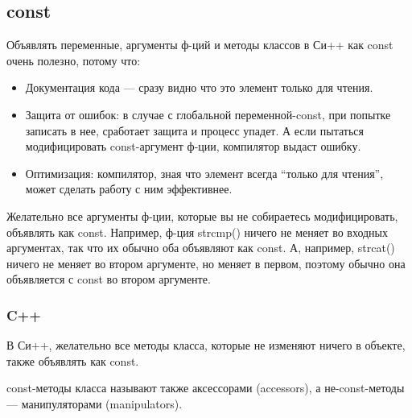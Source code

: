 ﻿\subsection{const}

Объявлять переменные, аргументы ф-ций и методы классов в Си++ как const очень полезно, потому что:

\begin{itemize}
\item
Документация кода --- сразу видно что это элемент только для чтения.

\item
Защита от ошибок: в случае с глобальной переменной-const, при попытке записать в нее, 
сработает защита и процесс упадет.
А если пытаться модифицировать const-аргумент ф-ции, компилятор выдаст ошибку.

\item
Оптимизация: компилятор, зная что элемент всегда ``только для чтения'', может сделать работу с ним эффективнее.
\end{itemize}

Желательно все аргументы ф-ции, которые вы не собираетесь модифицировать, объявлять как const.
Например, ф-ция strcmp() ничего не меняет во входных аргументах, так что их обычно оба объявляют как const.
А, например, strcat() ничего не меняет во втором аргументе, но меняет в первом, поэтому обычно она объявляется
с const во втором аргументе.

\subsubsection{C++}

В Си++, желательно все методы класса, которые не изменяют ничего в объекте, 
также объявлять как const.

const-методы класса называют также аксессорами (accessors), 
а не-const-методы --- манипуляторами (manipulators)\cite{Lakos}.
